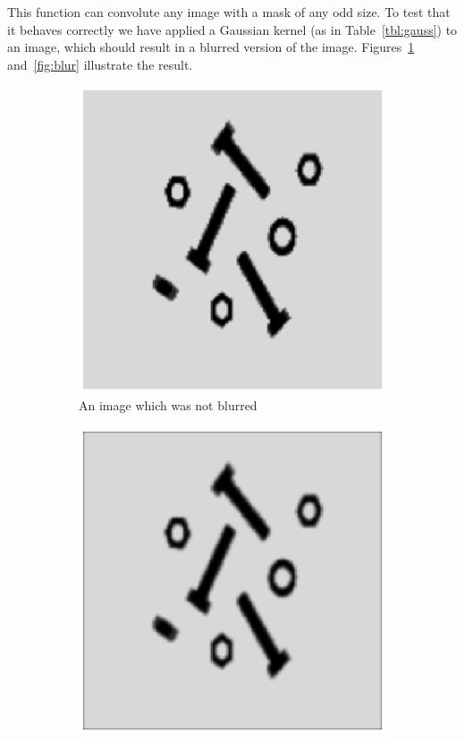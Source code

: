 This function can convolute any image with a mask of any odd size.
To test that it behaves correctly we have applied a Gaussian kernel (as in Table~\ref{tbl:gauss}) to an image, which should result in a blurred version of the image.
Figures~\ref{fig:nonblur} and~\ref{fig:blur} illustrate the result.
\begin{figure}[!htb]
 \centering
 \begin{subfigure}[b]{0.49\linewidth}
  \includegraphics[width=\textwidth]{notBlurred.eps} 
  \caption{An image which was not blurred}
  \label{fig:nonblur} 
 \end{subfigure}
 \begin{subfigure}[b]{0.49\linewidth}
  \includegraphics[width=\textwidth]{blurred.eps}

\end{subfigure}
\end{figure}
